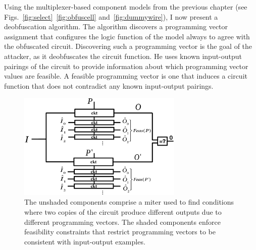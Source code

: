\documentclass[proposal]{umassthesis}  %
\begin{document}
Using the multiplexer-based component models from the previous chapter (see Figs.~\ref{fig:select}~\ref{fig:obfuscell} and~\ref{fig:dummywire}), I now present a deobfuscation algorithm. The algorithm discovers a programming vector assignment that configures the logic function of the model always to agree with the obfuscated circuit. Discovering such a programming vector is the goal of the attacker, as it deobfuscates the circuit function. He uses known input-output pairings of the circuit {to provide information about} which programming vector values are feasible. A feasible programming vector is one that induces a circuit function that does not contradict any known input-output pairings.

  \begin{figure}[!htb]
  \centering
    \includegraphics[width=0.7\textwidth]{./figures/miter} 
    \caption{The unshaded components comprise a miter used to find conditions where two copies of the circuit produce different outputs due to different programming vectors. The shaded components enforce feasibility constraints that restrict programming vectors to be consistent with input-output examples.}
    \label{fig:miter}
  \end{figure}

\end{document}
